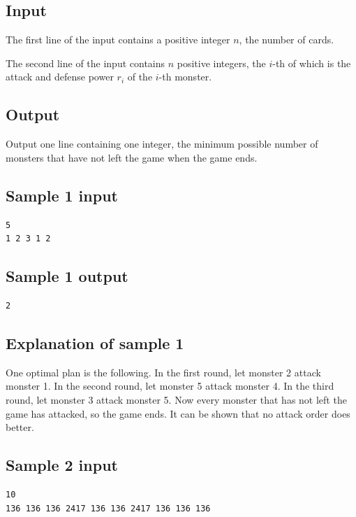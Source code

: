\documentclass[11pt]{article}
\begin{document}
\subsection*{Input}

The first line of the input contains a positive integer $n$, the number of
cards.

The second line of the input contains $n$ positive integers, the $i$-th of
which is the attack and defense power $r_i$ of the $i$-th monster.

\subsection*{Output}

Output one line containing one integer, the minimum possible number of
monsters that have not left the game when the game ends.

\subsection*{Sample 1 input}

\begin{verbatim}
5
1 2 3 1 2
\end{verbatim}

\subsection*{Sample 1 output}

\begin{verbatim}
2
\end{verbatim}

\subsection*{Explanation of sample 1}

One optimal plan is the following.
In the first round, let monster 2 attack monster 1.
In the second round, let monster 5 attack monster 4.
In the third round, let monster 3 attack monster 5.
Now every monster that has not left the game has attacked, so the game
ends.
It can be shown that no attack order does better.

\subsection*{Sample 2 input}

\begin{verbatim}
10
136 136 136 2417 136 136 2417 136 136 136
\end{verbatim}
\end{document}
